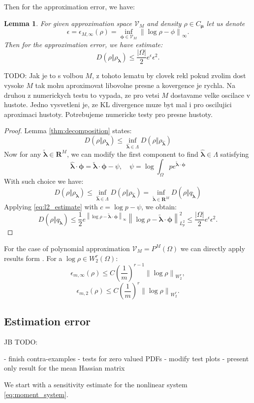 \documentclass{article}
\newtheorem{lemma}[theorem]{Lemma}
\def\vc#1{\mathbf{\boldsymbol{#1}}}     %
\newcommand{\norm}[1]{\left\lVert#1\right\rVert}
\def\todo#1{{\color{red}TODO: #1}}
\def\R{\mathbf{R}}
\def\abs#1{|#1|}
\def\vl{{\vc\lambda}}
\def\estvl{{\vc{\hat\lambda}}}
\def\vmu{\vc\mu}
\def\vphi{\vc\phi}
\newcommand{\jb}[1]{{\color{violet}#1}}  %
\begin{document}
Then for the approximation error, we have:
\begin{lemma}
\label{thm:approx_error}
For given approximation space $\mathcal V_M$ and density $\rho\in C_{\vmu}$ let us denote
\[
  \epsilon = \epsilon_{M,\infty}(\rho) = \inf_{\vphi \in \mathcal V_M} \norm{\log \rho - \phi}_\infty.
\]
Then for the approximation error, we have estimate:
\[
D(\rho\Vert\rho_{\vl})  \le \frac{\abs{\Omega}}{2} e^{\epsilon} \epsilon^2.
\]
\end{lemma}
\todo{Jak je to s volbou $M$, z tohoto lematu by clovek rekl pokud zvolim dost vysoke $M$ tak mohu aproximovat libovolne presne a kovergence je rychla. Na druhou z numerickych testu to vypada, ze pro vetsi $M$ dostavame velke oscilace v hustote. Jedno vysvetleni je, ze KL divergence muze byt mal i pro oscilujici aproximaci hustoty. Potrebujeme numericke testy pro presne hustoty.} 
\begin{proof}
Lemma \ref{thm:decomposition} states:
\[
D(\rho\Vert\rho_{\vl}) \le \inf_{\estvl \in \Lambda} D(\rho\Vert\rho_{\estvl})
\]
Now for any $\vc{\tilde\lambda} \in \R^M$, we can modify the first component to find $\estvl \in \Lambda$ satisfying
\[
  \estvl \cdot \vphi = \vc{\tilde\lambda} \cdot \vphi - \psi, \quad \psi 
                             = \log \int_\Omega p e^{\widetilde{\vc\lambda}\cdot \vc \phi}
\]
With such choice we have:
\[
D(\rho\Vert\rho_{\vl}) \le \inf_{\estvl \in \Lambda} D(\rho\Vert\rho_{\estvl})
=\inf_{\vc{\tilde\lambda} \in \R^M} D(\rho\Vert q_{\vc{\tilde\lambda}})
\]
Applying \eqref{eq:l2_estimate} with $c = \log p - \psi$, we obtain:
\[
  D(\rho\Vert q_{\vc{\tilde\lambda}}) \le 
  \frac{1}{2}
  e^{\norm{\log \rho - \vc{\tilde\lambda}\cdot \vc \phi}_\infty} 
    \norm{\log \rho - \vc{\tilde\lambda}\cdot \vc \phi}_{L^2_p}^2
  \le \frac{\abs{\Omega}}{2} e^{\epsilon} \epsilon^2.
\]
\end{proof}
For the case of polynomial approximation $\mathcal V_M = P^M(\Omega)$ we can directly apply results form \cite[Section 7]{Barron1991}. For a $\log\rho \in W^r_2(\Omega)$:
\[
    \epsilon_{m,\infty}(\rho) \le C \left(\frac{1}{m}\right)^{r-1} \norm{\log\rho}_{W^r_2},
\]
\[
    \epsilon_{m,2}(\rho) \le C \left(\frac{1}{m}\right)^{r}\norm{\log\rho}_{W^r_2}.
\]



\subsection{Estimation error}
\jb{JB TODO:

- finish contra-examples
- tests for zero valued PDFs
- modify test plots
- present only result for the mean Hassian matrix}
We start with a sensitivity estimate for the nonlinear system \eqref{eq:moment_system}.
\end{document}
